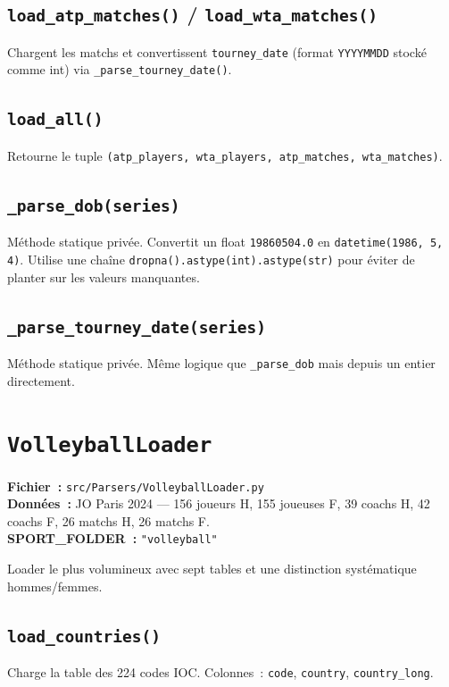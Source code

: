 \documentclass[12pt,a4paper]{article}
\begin{document}
\subsection{\texttt{load\_atp\_matches()} / \texttt{load\_wta\_matches()}}
Chargent les matchs et convertissent \texttt{tourney\_date} (format
\texttt{YYYYMMDD} stocké comme int) via \texttt{\_parse\_tourney\_date()}.

\subsection{\texttt{load\_all()}}
Retourne le tuple \texttt{(atp\_players, wta\_players, atp\_matches,
wta\_matches)}.

\subsection{\texttt{\_parse\_dob(series)}}
Méthode statique privée. Convertit un float \texttt{19860504.0} en
\texttt{datetime(1986, 5, 4)}. Utilise une chaîne
\texttt{dropna().astype(int).astype(str)} pour éviter de planter sur les
valeurs manquantes.

\subsection{\texttt{\_parse\_tourney\_date(series)}}
Méthode statique privée. Même logique que \texttt{\_parse\_dob} mais depuis
un entier directement.

\section{\texttt{VolleyballLoader}}

\textbf{Fichier~:} \texttt{src/Parsers/VolleyballLoader.py}\\
\textbf{Données~:} JO Paris 2024 — 156 joueurs H, 155 joueuses F, 39 coachs H,
42 coachs F, 26 matchs H, 26 matchs F.\\
\textbf{SPORT\_FOLDER~:} \texttt{"volleyball"}

Loader le plus volumineux avec sept tables et une distinction systématique
hommes/femmes.

\subsection{\texttt{load\_countries()}}
Charge la table des 224 codes IOC. Colonnes~: \texttt{code}, \texttt{country},
\texttt{country\_long}.
\end{document}
